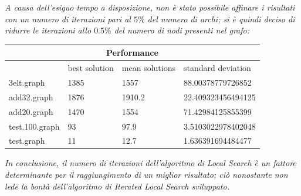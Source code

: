 \documentclass[12pt,titlepage,oneside]{article}
\begin{document}
\clearpage
\textit{A causa dell'esiguo tempo a disposizione, non è stato possibile affinare i risultati con un numero di iterazioni pari al $5\%$ del numero di archi; si è quindi deciso di ridurre le iterazioni allo $0.5\%$ del numero di nodi presenti nel grafo:}
\begin{table}[h!]
\begin{tabular}{ |p{3.5cm}||p{3.5cm}|p{3.5cm}|p{3.5cm}|  }
 \hline
 \multicolumn{4}{|c|}{Performance}\\
 \hline
  & best solution & mean solutions & standard deviation\\
 \hline
 3elt.graph & 1385 & 1557 & 88.00378779726852\\
 add32.graph & 1876 & 1910.2 & 22.409323456494125\\
 add20.graph & 1470 & 1554 & 71.42984125855399\\
 test.100.graph & 93 & 97.9 & 3.5103022978402048\\
 test.graph & 11 & 12.7 & 1.636391694484477\\
 \hline
\end{tabular}
\end{table}

\textit{In conclusione, il numero di iterazioni dell'algoritmo di Local Search è un fattore determinante per il raggiungimento di un miglior risultato; ciò nonostante non lede la bontà dell'algoritmo di Iterated Local Search sviluppato.}
\end{document}
